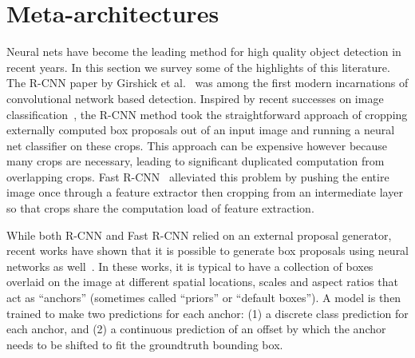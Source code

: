 \documentclass[10pt,twocolumn,letterpaper]{article}
\newcommand{\eat}[1]{}
\begin{document}
 \section{Meta-architectures}
\label{sec:related}

Neural nets have become the leading method for high quality object detection in recent years. 
In this section we survey some of the highlights of this literature.
The R-CNN paper by Girshick et al.~\cite{girshick2014rich} was among the first modern incarnations of convolutional network based detection.  Inspired by recent successes on image classification~\cite{krizhevsky2012imagenet}, the R-CNN method took the straightforward approach of cropping externally computed box proposals out of an input image and running a neural net classifier on these crops.  This approach can be expensive however because many crops are necessary, leading to significant duplicated computation from overlapping crops.  Fast R-CNN~\cite{girshick2015fast} alleviated this problem by pushing the entire image once through a feature extractor then cropping from an intermediate layer so that crops share the computation load of
feature extraction.

 While both R-CNN and Fast R-CNN relied on an external proposal generator, recent  works have shown that it is possible to generate box proposals using neural networks as well~\cite{szegedy2013deep,szegedy2014scalable,erhan2014scalable,ren2015faster}.  In these works, it is typical to have a collection of boxes overlaid on the image at different spatial locations, scales and aspect ratios that act as ``anchors'' (sometimes called ``priors'' or ``default boxes'').
A model is then trained to make two predictions for each anchor: (1) a discrete class prediction for each anchor, and (2) a continuous prediction of an offset by which the anchor needs to be shifted to fit the groundtruth bounding box.  

\eat{
\begin{figure}[t!]
\begin{center}
\texttt{[image: Figures/boat\_example.pdf]}
\caption{
\footnotesize An example tiled grid of anchors overlaid on an image with
a positive anchor (blue) and its matching groundtruth box (green).  In this image, all other anchors are negative.  Note that in general, anchors overlap and might be tiled in scale and aspect ratio as well. 
}
\end{center}\vspace{-4mm}
\label{fig:boat_example}
\end{figure}
}
\end{document}
